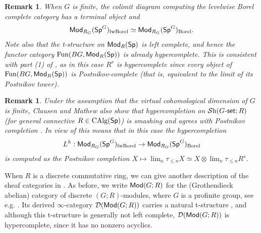 \documentclass[reqno]{amsart}
\numberwithin{equation}{section}\theoremstyle{thms}
\theoremstyle{defn}
\newtheorem{rem}[equation]{Remark}
\newcommand{\cD}{\mathcal{D}}
\newcommand{\tn}[1]{\textnormal{#1}}
\newcommand{\tsf}[1]{\textsf{\textup{#1}}}
\newcommand{\mcal}[1]{\mathcal{#1}}
\newcommand{\fun}{\tn{Fun}}
\newcommand{\sheaves}{\mcal{S}\tn{h}}
\newcommand{\calg}{\tn{CAlg}}
\newcommand{\modgr}{\tsf{Mod}(G;R)}
\newcommand{\Mod}{\tsf{Mod}}
\newcommand{\spec}{\tsf{Sp}}
\newcommand{\specg}{\tsf{Sp}^G}
\newcommand{\gset}{G\tsf{-set}}
\begin{document}
\begin{rem}
When $G$ is finite, the colimit diagram computing the levelwise Borel complete category has a terminal object and
$$\Mod_{R_G}(\specg)_{\tn{lwBorel}} \simeq \Mod_{R_G}(\specg)_{\tn{Borel}}.$$
Note also that the t-structure on $\Mod_R(\spec)$ is left complete, and hence the functor category $\fun(BG,\Mod_R(\spec))$ is already hypercomplete. This is consistent with part (1) of , as in this case $R^s$ is hypercomplete since every object of $\fun(BG,\Mod_R(\spec))$ is Postnikov-complete (that is, equivalent to the limit of its Postnikov tower).
\end{rem}

\begin{rem}
Under the assumption that the virtual cohomological dimension of $G$ is finite, Clausen and Mathew also show that hypercompletion on $\sheaves(\gset;R)$ (for general connective $R \in \calg(\spec)$) is smashing and agrees with Postnikov completion \cite[Corollary 4.28, Proposition 2.10]{cm21}. In view of  this means that in this case the hypercompletion
$$L^h: \Mod_{R_G}(\specg)_{\tn{lwBorel}} \to \Mod_{R_G}(\specg)_{\tn{Borel}}$$
is computed as the Postnikov completion $X \mapsto \lim_{n} \tau_{\leq n} X \simeq X \otimes \lim_n \tau_{\leq n} R^s$.
\end{rem}

When $R$ is a discrete commutative ring, we can give another description of the sheaf categories in . As before, we write $\modgr$ for the (Grothendieck abelian) category of discrete $(G;R)$-modules, where $G$ is a profinite group, see e.g. \cite[§2]{bg23}. Its derived $\infty$-category $\cD(\modgr)$ carries a natural t-structure \cite[Proposition 1.3.5.21]{lur17}, and although this t-structure is generally not left complete, $\cD(\modgr)$ is hypercomplete, since it has no nonzero acyclics.
\end{document}
